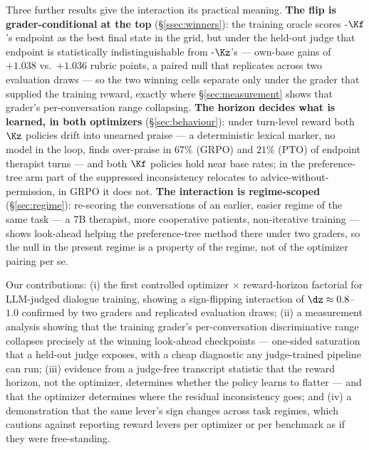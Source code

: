 Three further results give the interaction its practical meaning. \textbf{The flip is
grader-conditional at the top} (\S\ref{ssec:winners}): the training oracle scores \GRPO-$\Kf$'s
endpoint as the best final state in the grid, but under the held-out judge that endpoint is
statistically indistinguishable from \PTO-$\Kz$'s --- own-base gains of $+1.038$ vs.\ $+1.036$
rubric points, a paired null that replicates across two evaluation draws --- so the two winning
cells separate only under the grader that supplied the training reward, exactly where
\S\ref{sec:measurement} shows that grader's per-conversation range collapsing.
\textbf{The horizon decides what is
learned, in both optimizers} (\S\ref{sec:behaviour}): under turn-level reward both $\Kz$ policies
drift into unearned praise --- a deterministic lexical marker, no model in the loop, finds
over-praise in $67\%$ (GRPO) and $21\%$ (PTO) of endpoint therapist turns --- and both $\Kf$
policies hold near base rates; in the preference-tree arm part of the suppressed inconsistency
relocates to advice-without-permission, in GRPO it does not. \textbf{The interaction is
regime-scoped} (\S\ref{sec:regime}): re-scoring the conversations of an earlier, easier regime of
the same task --- a 7B therapist, more cooperative patients, non-iterative training --- shows
look-ahead helping the preference-tree method there under two graders, so the null in the present
regime is a property of the regime, not of the optimizer pairing per se.

Our contributions: (i) the first controlled optimizer $\times$ reward-horizon factorial for
LLM-judged dialogue training, showing a sign-flipping interaction of $\dz \approx 0.8$--$1.0$
confirmed by two graders and replicated evaluation draws; (ii) a measurement analysis showing
that the training grader's per-conversation discriminative range collapses precisely at the
winning look-ahead checkpoints --- one-sided saturation that a held-out judge exposes, with a
cheap diagnostic any judge-trained pipeline can run; (iii) evidence from a judge-free transcript statistic that
the reward horizon, not the optimizer, determines whether the policy learns to flatter --- and
that the optimizer determines where the residual inconsistency goes; and (iv) a demonstration
that the same lever's sign changes across task regimes, which cautions against reporting reward
levers per optimizer or per benchmark as if they were free-standing.
